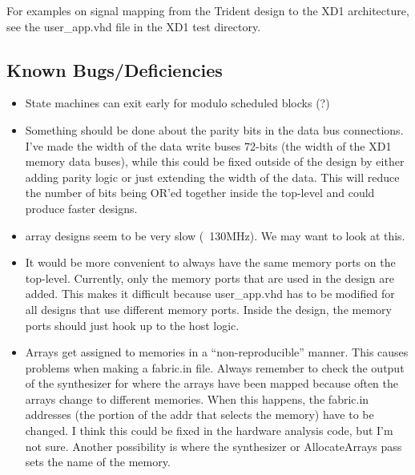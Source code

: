 For examples on signal mapping from the Trident design to the XD1
architecture, see the user\_app.vhd file in the XD1 test directory.

\subsection{Known Bugs/Deficiencies}
\begin{itemize}
\item State machines can exit early for modulo scheduled blocks (?)

\item Something should be done about the parity bits in the data bus
  connections.  I've made the width of the data write buses 72-bits
  (the width of the XD1 memory data buses), while this could be fixed
  outside of the design by either adding parity logic or just
  extending the width of the data.  This will reduce the number of
  bits being OR'ed together inside the top-level and could produce
  faster designs.

\item array designs seem to be very slow (~130MHz).  We may want to
  look at this.
\item It would be more convenient to always have the same memory ports
  on the top-level.  Currently, only the memory ports that are used in
  the design are added.  This makes it difficult because user\_app.vhd
  has to be modified for all designs that use different memory ports.
  Inside the design, the memory ports should just hook up to the host
  logic.

\item Arrays get assigned to memories in a ``non-reproducible''
  manner.  This causes problems when making a fabric.in file.  Always
  remember to check the output of the synthesizer for where the arrays
  have been mapped because often the arrays change to different
  memories.  When this happens, the fabric.in addresses (the portion
  of the addr that selects the memory) have to be changed.  I think
  this could be fixed in the hardware analysis code, but I'm not sure.
  Another possibility is where the synthesizer or AllocateArrays pass
  sets the name of the memory.


\end{itemize}
